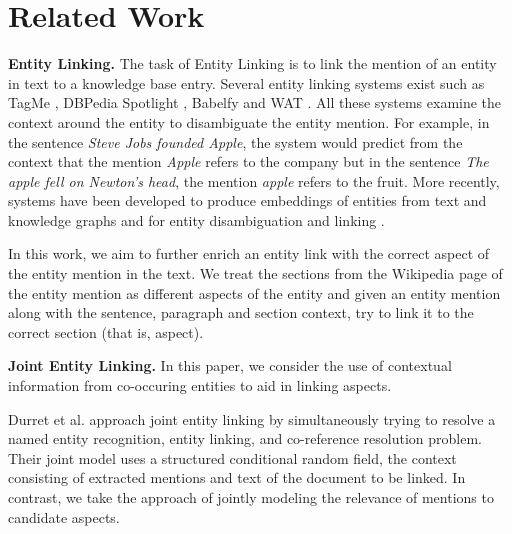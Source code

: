 
\section{Related Work}
\label{sec:Related Work}

\textbf{Entity Linking.}
The task of Entity Linking is to link the mention of an entity in text to a knowledge base entry. Several entity linking systems exist such as TagMe \cite{ferragina2010tagme}, DBPedia Spotlight \cite{mendes2011dbpedia}, Babelfy \cite{babelfy} and WAT \cite{piccinno2014wat}. All these systems examine the context around the entity to disambiguate the entity mention. 
For example, in the sentence \textit{Steve Jobs founded Apple}, the system would predict from the context that the mention \textit{Apple} refers to the company but in the sentence \textit{The apple fell on Newton's head}, the mention \textit{apple} refers to the fruit. 
More recently, systems have been developed to produce embeddings of entities from text and knowledge graphs \cite{huang2015leveraging,ristoski2016rdf2vec,yamada2016joint} and for entity disambiguation and linking \cite{yamada2017learning}. 

In this work, we aim to further enrich an entity link with the correct aspect of the entity mention in the text. We treat the sections from the Wikipedia page of the entity mention as different aspects of the entity and given an entity mention along with the sentence, paragraph and section context, try to link it to the correct section (that is, aspect).

\textbf{Joint Entity Linking.} In this paper, we consider the use of contextual information from co-occuring entities to aid in linking aspects.

Durret et al. \cite{durrett2014joint} approach joint entity linking by simultaneously trying to resolve a named entity recognition, entity linking, and co-reference resolution problem. Their joint model uses a structured conditional random field, the context consisting of extracted mentions and text of the document to be linked. In contrast, we take the approach of jointly modeling the relevance of mentions to candidate aspects.

